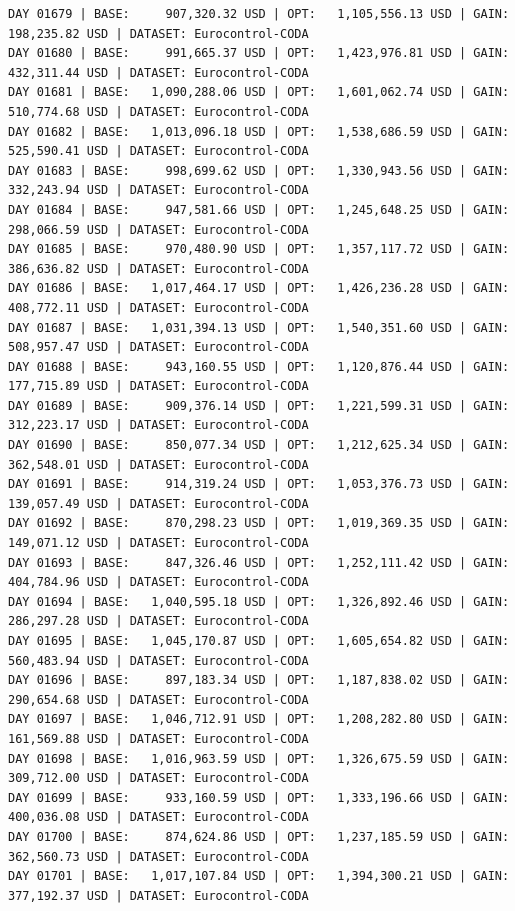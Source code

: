 \documentclass[11pt,a4paper]{article}
\begin{document}
\begin{verbatim}
DAY 01679 | BASE:     907,320.32 USD | OPT:   1,105,556.13 USD | GAIN: 198,235.82 USD | DATASET: Eurocontrol-CODA
DAY 01680 | BASE:     991,665.37 USD | OPT:   1,423,976.81 USD | GAIN: 432,311.44 USD | DATASET: Eurocontrol-CODA
DAY 01681 | BASE:   1,090,288.06 USD | OPT:   1,601,062.74 USD | GAIN: 510,774.68 USD | DATASET: Eurocontrol-CODA
DAY 01682 | BASE:   1,013,096.18 USD | OPT:   1,538,686.59 USD | GAIN: 525,590.41 USD | DATASET: Eurocontrol-CODA
DAY 01683 | BASE:     998,699.62 USD | OPT:   1,330,943.56 USD | GAIN: 332,243.94 USD | DATASET: Eurocontrol-CODA
DAY 01684 | BASE:     947,581.66 USD | OPT:   1,245,648.25 USD | GAIN: 298,066.59 USD | DATASET: Eurocontrol-CODA
DAY 01685 | BASE:     970,480.90 USD | OPT:   1,357,117.72 USD | GAIN: 386,636.82 USD | DATASET: Eurocontrol-CODA
DAY 01686 | BASE:   1,017,464.17 USD | OPT:   1,426,236.28 USD | GAIN: 408,772.11 USD | DATASET: Eurocontrol-CODA
DAY 01687 | BASE:   1,031,394.13 USD | OPT:   1,540,351.60 USD | GAIN: 508,957.47 USD | DATASET: Eurocontrol-CODA
DAY 01688 | BASE:     943,160.55 USD | OPT:   1,120,876.44 USD | GAIN: 177,715.89 USD | DATASET: Eurocontrol-CODA
DAY 01689 | BASE:     909,376.14 USD | OPT:   1,221,599.31 USD | GAIN: 312,223.17 USD | DATASET: Eurocontrol-CODA
DAY 01690 | BASE:     850,077.34 USD | OPT:   1,212,625.34 USD | GAIN: 362,548.01 USD | DATASET: Eurocontrol-CODA
DAY 01691 | BASE:     914,319.24 USD | OPT:   1,053,376.73 USD | GAIN: 139,057.49 USD | DATASET: Eurocontrol-CODA
DAY 01692 | BASE:     870,298.23 USD | OPT:   1,019,369.35 USD | GAIN: 149,071.12 USD | DATASET: Eurocontrol-CODA
DAY 01693 | BASE:     847,326.46 USD | OPT:   1,252,111.42 USD | GAIN: 404,784.96 USD | DATASET: Eurocontrol-CODA
DAY 01694 | BASE:   1,040,595.18 USD | OPT:   1,326,892.46 USD | GAIN: 286,297.28 USD | DATASET: Eurocontrol-CODA
DAY 01695 | BASE:   1,045,170.87 USD | OPT:   1,605,654.82 USD | GAIN: 560,483.94 USD | DATASET: Eurocontrol-CODA
DAY 01696 | BASE:     897,183.34 USD | OPT:   1,187,838.02 USD | GAIN: 290,654.68 USD | DATASET: Eurocontrol-CODA
DAY 01697 | BASE:   1,046,712.91 USD | OPT:   1,208,282.80 USD | GAIN: 161,569.88 USD | DATASET: Eurocontrol-CODA
DAY 01698 | BASE:   1,016,963.59 USD | OPT:   1,326,675.59 USD | GAIN: 309,712.00 USD | DATASET: Eurocontrol-CODA
DAY 01699 | BASE:     933,160.59 USD | OPT:   1,333,196.66 USD | GAIN: 400,036.08 USD | DATASET: Eurocontrol-CODA
DAY 01700 | BASE:     874,624.86 USD | OPT:   1,237,185.59 USD | GAIN: 362,560.73 USD | DATASET: Eurocontrol-CODA
DAY 01701 | BASE:   1,017,107.84 USD | OPT:   1,394,300.21 USD | GAIN: 377,192.37 USD | DATASET: Eurocontrol-CODA

\end{verbatim}
\end{document}
